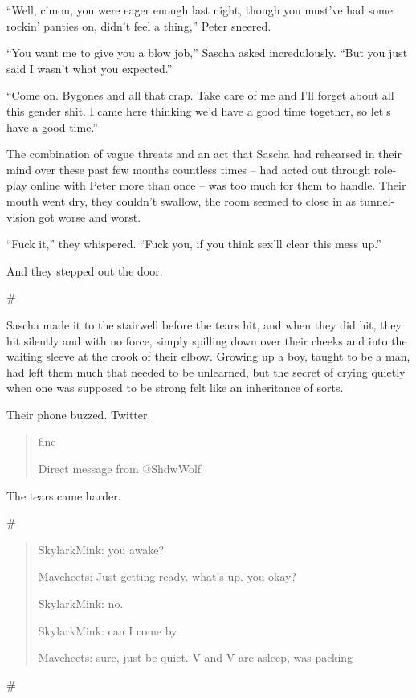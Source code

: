 \documentclass[12pt,letterpaper,oneside]{memoir}
\newcommand\secdiv{
  \begin{center}
    \#
  \end{center}
}
\begin{document}
  ``Well, c'mon, you were eager enough last night, though you must've had some rockin' panties on, didn't feel a thing,'' Peter sneered.

  ``You want me to give you a blow job,'' Sascha asked incredulously. ``But you just said I wasn't what you expected.''

  ``Come on. Bygones and all that crap. Take care of me and I'll forget about all this gender shit. I came here thinking we'd have a good time together, so let's have a good time.''

  The combination of vague threats and an act that Sascha had rehearsed in their mind over these past few months countless times -- had acted out through role-play online with Peter more than once -- was too much for them to handle. Their mouth went dry, they couldn't swallow, the room seemed to close in as tunnel-vision got worse and worst.

  ``Fuck it,'' they whispered. ``Fuck you, if you think sex'll clear this mess up.''

  And they stepped out the door.

  \secdiv

  Sascha made it to the stairwell before the tears hit, and when they did hit, they hit silently and with no force, simply spilling down over their cheeks and into the waiting sleeve at the crook of their elbow. Growing up a boy, taught to be a man, had left them much that needed to be unlearned, but the secret of crying quietly when one was supposed to be strong felt like an inheritance of sorts.

  Their phone buzzed. Twitter.

  \begin{quotation}
    fine

    Direct message from @ShdwWolf
  \end{quotation}

  The tears came harder.

  \secdiv

  \begin{quotation}
    SkylarkMink: you awake?

    Mavcheets: Just getting ready. what's up. you okay?

    SkylarkMink: no.

    SkylarkMink: can I come by

    Mavcheets: sure, just be quiet. V and V are asleep, was packing
  \end{quotation}

  \secdiv
\end{document}
